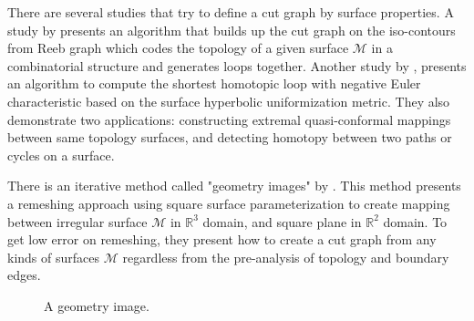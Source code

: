 \documentclass[a4paper,twoside]{article}
\begin{document}
There are several studies that try to define a cut graph by surface properties. A study by \cite{Patane:2007:FCB:1224804.1224947} presents an algorithm that builds up the cut graph on the iso-contours from Reeb graph which codes the topology of a given surface $\mathscr{M}$ in a combinatorial structure and generates loops together. Another study by \cite{Jin:2013:CSH:2396897.2396971}, presents an algorithm to compute the shortest homotopic loop with negative Euler characteristic based on the surface hyperbolic uniformization metric. They also demonstrate two applications: constructing extremal quasi-conformal mappings between same topology surfaces, and detecting homotopy between two paths or cycles on a surface. 

There is an iterative method called "geometry images" by \cite{Gu:2002:GI:566654.566589}. This method presents a remeshing approach using square surface parameterization to create mapping between irregular surface $\mathscr{M}$ in $\mathbb{R}^3$ domain, and square plane in $\mathbb{R}^2$ domain. To get low error on remeshing, they present how to create a cut graph from any kinds of surfaces $\mathscr{M}$ regardless from the pre-analysis of topology and boundary edges.

\begin{figure}[!h]
	\centering
	\hspace{10pt}
	
	\caption{A geometry image.}
	\label{fig:gim figure}
\end{figure}
\end{document}
